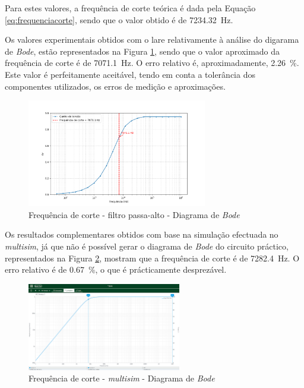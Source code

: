 Para estes valores, a frequência de corte teórica é dada pela Equação \ref{eq:frequenciacorte}, sendo que o valor obtido é de \SI{7234.32}{\hertz}.

Os valores experimentais obtidos com o \acrshort{lare} relativamente à análise do digarama de \textit{Bode}, estão representados na Figura \ref{fig:fcBode}, sendo que o valor aproximado da frequência de corte é de \SI{7071.1}{\hertz}. O erro relativo é, aproximadamente, \SI{2.26}{\percent}. Este valor é perfeitamente aceitável, tendo em conta a tolerância dos componentes utilizados, os erros de medição e aproximações.

\begin{figure}[hbtp]
	\centering
	\includegraphics[width=0.7\textwidth]{figures/bode_hpf_fc.png}
	\caption{Frequência de corte - filtro passa-alto - Diagrama de \textit{Bode}}
	\label{fig:fcBode}
\end{figure}

Os resultados complementares obtidos com base na simulação efectuada no \textit{multisim}, já que não é possível gerar o diagrama de \textit{Bode} do circuito práctico, representados na Figura \ref{fig:fcBodemultisim}, mostram que a frequência de corte é de \SI{7282.4}{\hertz}. O erro relativo é de \SI{0.67}{\percent}, o que é prácticamente desprezável.

\begin{figure}[hbtp]
	\centering
	\includegraphics[width=0.6\textwidth]{figures/boda_HPF_fc.png}
	\caption{Frequência de corte - \textit{multisim} - Diagrama de \textit{Bode}}
	\label{fig:fcBodemultisim}
\end{figure}

